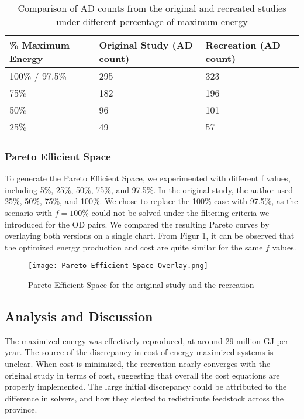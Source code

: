 \documentclass[12pt]{article}
\begin{document}
\begin{table}[h]
  \centering
  \begin{tabular}{|p{4cm} | p{5cm} | p{5cm}|}
  \hline
  \rowcolor{gray!30}
  \% Maximum Energy & Original Study (AD count) & Recreation (AD count) \\ \hline
  100\% / 97.5\% & 295 & 323 \\ \hline
  75\% & 182 & 196 \\ \hline
  50\% & 96 & 101 \\ \hline
  25\% & 49 & 57 \\ \hline
  \end{tabular}
  \caption{Comparison of AD counts from the original and recreated studies under different percentage of maximum energy}
  \label{tab:adplants_energy}
\end{table}

\subsubsection{Pareto Efficient Space}

To generate the Pareto Efficient Space, we experimented with different f values, including 5\%, 25\%, 50\%, 75\%, and 97.5\%. In the original study, the author used 25\%, 50\%, 75\%, and 100\%. We chose to replace the 100\% case with 97.5\%, as the scenario with $f = 100\%$ could not be solved under the filtering criteria we introduced for the OD pairs. We compared the resulting Pareto curves by overlaying both versions on a single chart. From Figur 1, it can be observed that the optimized energy production and cost are quite similar for the same $f$ values.

\begin{figure}[H]
  \centering
  \texttt{[image: Pareto Efficient Space Overlay.png]}
  \caption{Pareto Efficient Space for the original study and the recreation}
  \label{fig:pareto_curve}
\end{figure}

\subsection{Analysis and Discussion}
The maximized energy was effectively reproduced, at around 29 million GJ per year. The source of the discrepancy in cost of energy-maximized systems is unclear. When cost is minimized, the recreation nearly converges with the original study in terms of cost, suggesting that overall the cost equations are properly implemented. The large initial discrepancy could be attributed to the difference in solvers, and how they elected to redistribute feedstock across the province. 
\end{document}
